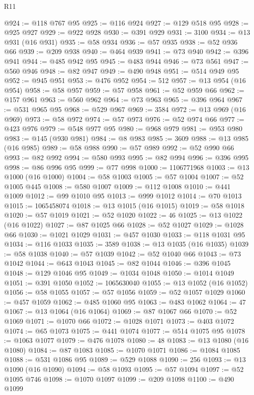 \begin{lexlean}{R11}
\begin{coremodule}
@924 := @118 @767 @95
@925 := @116 @924
@927 := @129 @518 @95
@928 := @925 @927
@929 := @922 @928
@930 := @391 @929
@931 := 3100
@934 := @13 @931 (@16 @931)
@935 := @58 @934
@936 := @57 @935
@938 := @52 @936 @66
@939 := @209 @938
@940 := @464 @939
@941 := @73 @940
@942 := @396 @941
@944 := @485 @942 @95
@945 := @483 @944
@946 := @73 @561
@947 := @560 @946
@948 := @82 @947
@949 := @490 @948
@951 := @514 @949 @95
@952 := @945 @951
@953 := @476 @952
@954 := 512
@957 := @13 @954 (@16 @954)
@958 := @58 @957
@959 := @57 @958
@961 := @52 @959 @66
@962 := @157 @961
@963 := @560 @962
@964 := @73 @963
@965 := @396 @964
@967 := @531 @965 @95
@968 := @529 @967
@969 := 3584
@972 := @13 @969 (@16 @969)
@973 := @58 @972
@974 := @57 @973
@976 := @52 @974 @66
@977 := @423 @976
@979 := @548 @977 @95
@980 := @968 @979
@981 := @953 @980
@983 := @145 (@930 @981)
@984 := @8 @983
@985 := 3609
@988 := @13 @985 (@16 @985)
@989 := @58 @988
@990 := @57 @989
@992 := @52 @990 @66
@993 := @82 @992
@994 := @580 @993
@995 := @82 @994
@996 := @396 @995
@998 := @86 @996 @95
@999 := @77 @998
@1000 := 1106771968
@1003 := @13 @1000 (@16 @1000)
@1004 := @58 @1003
@1005 := @57 @1004
@1007 := @52 @1005 @445
@1008 := @580 @1007
@1009 := @112 @1008
@1010 := @441 @1009
@1012 := @99 @1010 @95
@1013 := @999 @1012
@1014 := @70 @1013
@1015 := 1065458074
@1018 := @13 @1015 (@16 @1015)
@1019 := @58 @1018
@1020 := @57 @1019
@1021 := @52 @1020
@1022 := 46
@1025 := @13 @1022 (@16 @1022)
@1027 := @87 @1025 @66
@1028 := @52 @1027
@1029 := @1028 @66
@1030 := @1021 @1029
@1031 := @457 @1030
@1033 := @118 @1031 @95
@1034 := @116 @1033
@1035 := 3589
@1038 := @13 @1035 (@16 @1035)
@1039 := @58 @1038
@1040 := @57 @1039
@1042 := @52 @1040 @66
@1043 := @73 @1042
@1044 := @643 @1043
@1045 := @82 @1044
@1046 := @396 @1045
@1048 := @129 @1046 @95
@1049 := @1034 @1048
@1050 := @1014 @1049
@1051 := @391 @1050
@1052 := 1065630040
@1055 := @13 @1052 (@16 @1052)
@1056 := @58 @1055
@1057 := @57 @1056
@1059 := @52 @1057 @1029
@1060 := @457 @1059
@1062 := @485 @1060 @95
@1063 := @483 @1062
@1064 := 47
@1067 := @13 @1064 (@16 @1064)
@1069 := @87 @1067 @66
@1070 := @52 @1069
@1071 := @1070 @66
@1072 := @1028 @1071
@1073 := @403 @1072
@1074 := @65 @1073
@1075 := @441 @1074
@1077 := @514 @1075 @95
@1078 := @1063 @1077
@1079 := @476 @1078
@1080 := 48
@1083 := @13 @1080 (@16 @1080)
@1084 := @87 @1083
@1085 := @1070 @1071
@1086 := @1084 @1085
@1088 := @531 @1086 @95
@1089 := @529 @1088
@1090 := 256
@1093 := @13 @1090 (@16 @1090)
@1094 := @58 @1093
@1095 := @57 @1094
@1097 := @52 @1095 @746
@1098 := @1070 @1097
@1099 := @209 @1098
@1100 := @490 @1099

\end{coremodule}
\end{lexlean}
